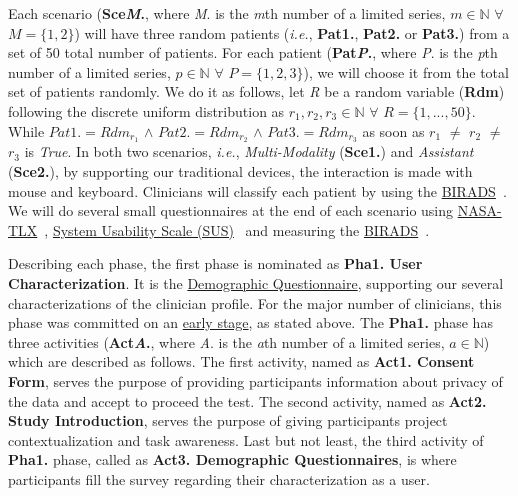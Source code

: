 Each scenario (\textbf{Sce\textit{M}.}, where \textit{M}. is the \textit{m}th number of a limited series, $m \in \mathbb{N}$ $\forall$ $M = \{1, 2\}$) will have three random patients (\textit{i.e.}, \textbf{Pat1.}, \textbf{Pat2.} or \textbf{Pat3.}) from a set of 50 total number of patients. For each patient (\textbf{Pat\textit{P}.}, where \textit{P}. is the \textit{p}th number of a limited series, $p \in \mathbb{N}$ $\forall$ $P = \{1, 2, 3\}$), we will choose it from the total set of patients randomly. We do it as follows, let \textit{R} be a random variable (\textbf{Rdm}) following the discrete uniform distribution as $r_{1}, r_{2}, r_{3} \in \mathbb{N}$ $\forall$ $R = \{1, ..., 50\}$. While $Pat1. = Rdm_{r_{1}}$ $\wedge$ $Pat2. = Rdm_{r_{2}}$ $\wedge$ $Pat3. = Rdm_{r_{3}}$ as soon as $r_{1}$ $\neq$ $r_{2}$ $\neq$ $r_{3}$ is \textit{True}. In both two scenarios, \textit{i.e.}, \textit{Multi-Modality} (\textbf{Sce1.}) and \textit{Assistant} (\textbf{Sce2.}), by supporting our traditional devices, the interaction is made with mouse and keyboard. Clinicians will classify each patient by using the \hyperlink{https://en.wikipedia.org/wiki/BI-RADS}{BIRADS}~\cite{balleyguier2007birads}. We will do several small questionnaires at the end of each scenario using \hyperlink{https://en.wikipedia.org/wiki/NASA-TLX}{NASA-TLX}~\cite{ramkumar2017using}, \hyperlink{https://en.wikipedia.org/wiki/System_usability_scale}{System Usability Scale (SUS)}~\cite{orfanou2015perceived} and measuring the \hyperlink{https://en.wikipedia.org/wiki/BI-RADS}{BIRADS}~\cite{balleyguier2007birads}.

Describing each phase, the first phase is nominated as \textbf{Pha1. User Characterization}. It is the \hyperlink{https://docs.google.com/spreadsheets/d/1h-4neEo3RbYsJs3JHBGvogHCvz3UFnMvsmoernfCuDU/edit?usp=sharing}{Demographic Questionnaire}, supporting our several characterizations of the clinician profile. For the major number of clinicians, this phase was committed on an \hyperlink{https://github.com/MIMBCD-UI/testing-guide-breast/tree/master/samples/test_4}{early stage}, as stated above. The \textbf{Pha1.} phase has three activities (\textbf{Act\textit{A}.}, where \textit{A}. is the \textit{a}th number of a limited series, $a \in \mathbb{N}$) which are described as follows. The first activity, named as \textbf{Act1. Consent Form}, serves the purpose of providing participants information about privacy of the data and accept to proceed the test. The second activity, named as \textbf{Act2. Study Introduction}, serves the purpose of giving participants project contextualization and task awareness. Last but not least, the third activity of \textbf{Pha1.} phase, called as \textbf{Act3. Demographic Questionnaires}, is where participants fill the survey regarding their characterization as a user.

